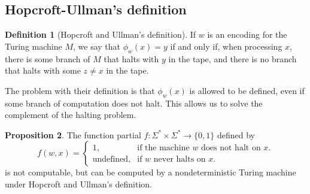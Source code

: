 \documentclass[12pt]{article}
\theoremstyle{definition}
\newtheorem{definition}{Definition}
\newtheorem{proposition}[definition]{Proposition}
\begin{document}
\subsection{Hopcroft-Ullman's definition}
\label{sec:hopcroft-ullman}

\begin{definition}[Hopcroft and Ullman's definition\footnotemark]
    If $w$ is an encoding for the Turing machine $M$,
    we say that $\phi_w(x) = y$ if and only if,
    when processing $x$,
    there is some branch of $M$ that halts with $y$ in the tape,
    and there is no branch that halts with some $z \neq x$ in the tape.
\end{definition}

The problem with their definition is that $\phi_w(x)$ is allowed to be defined,
even if some branch of computation does not halt.
This allows us to solve the complement of the halting problem.

\begin{proposition}
    The function partial $f: \Sigma^* \times \Sigma^* \to \{0, 1\}$ defined by
    \begin{equation*}
        f(w, x) = \begin{cases}
            1, & \text{if the machine $w$ does not halt on $x$.} \\
            \text{undefined}, &\text{if $w$ never halts on $x$.}
        \end{cases}
    \end{equation*}
    is not computable,
    but can be computed by a nondeterministic Turing machine under
    Hopcroft and Ullman's definition.
\end{proposition}
\end{document}
